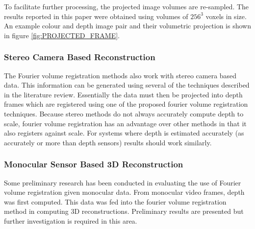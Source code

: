 To facilitate further processing, the projected image volumes are re-sampled. The results reported in this paper were obtained using volumes of $256^3$ voxels in size. An example colour and depth image pair and their volumetric projection is shown in figure \ref{fig:PROJECTED_FRAME}.  \\


\subsubsection{Stereo Camera Based Reconstruction}

The Fourier volume registration methods also work with stereo camera based data. This information can be generated using several of the techniques described in the literature review. Essentially the data must then be projected into depth frames which are registered using one of the proposed fourier volume registration techniques. Because stereo methods do not always accurately compute depth to scale, fourier volume registration has an advantage over other methods in that it also registers against scale. For systems where depth is estimated accurately (as accurately or more than depth sensors) results should work similarly.

\subsubsection{Monocular Sensor Based 3D Reconstruction}

Some preliminary research has been conducted in evaluating the use of Fourier volume registration given monocular data. From monocular video frames, depth was first computed. This data was fed into the fourier volume registration method in computing 3D reconstructions. Preliminary results are presented but further investigation is required in this area.

